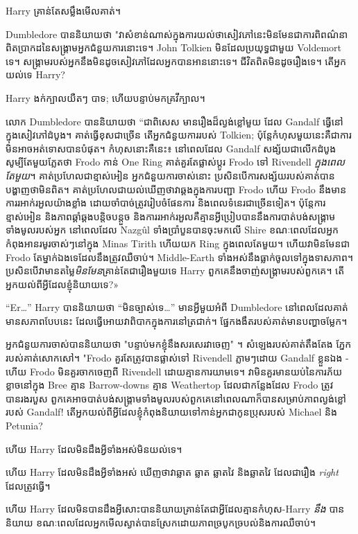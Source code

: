 {Harry គ្រាន់តែសម្លឹងមើលគាត់។

Dumbledore បាននិយាយថា "វាសំខាន់ណាស់ក្នុងការយល់ថាសៀវភៅនេះមិនមែនជាការពិពណ៌នាពិតប្រាកដនៃសង្រ្គាមអ្នកជំនួយការនោះទេ។ John Tolkien មិនដែលប្រយុទ្ធជាមួយ Voldemort ទេ។ សង្រ្គាមរបស់អ្នកនឹងមិនដូចសៀវភៅដែលអ្នកបានអាននោះទេ។ ជីវិតពិតមិនដូចរឿងទេ។ តើអ្នកយល់ទេ Harry?

Harry ងក់ក្បាលយឺតៗ បាទ; ហើយបន្ទាប់មកគ្រវីក្បាល។

លោក Dumbledore បាននិយាយថា “ជាពិសេស មានរឿងដ៏ល្ងង់ខ្លៅមួយ ដែល Gandalf ធ្វើនៅក្នុងសៀវភៅដំបូង។ គាត់ធ្វើខុសជាច្រើន តើអ្នកជំនួយការរបស់ Tolkien; ប៉ុន្តែ​កំហុស​មួយ​នេះ​គឺ​ជា​ការ​មិន​អាច​អត់​ទោស​បាន​បំផុត​។ កំហុសនោះគឺនេះ៖ នៅពេលដែល Gandalf សង្ស័យជាលើកដំបូង សូម្បីតែមួយភ្លែតថា Frodo កាន់ One Ring គាត់គួរតែផ្លាស់ប្តូរ Frodo ទៅ Rivendell \emph{ក្នុងពេលតែមួយ}។ គាត់ប្រហែលជាខ្មាស់អៀន អ្នកជំនួយការចាស់នោះ ប្រសិនបើការសង្ស័យរបស់គាត់បានបង្ហាញថាមិនពិត។ គាត់ប្រហែលជាយល់ឃើញថាវាឆ្គងក្នុងការបញ្ជា Frodo ហើយ Frodo នឹងមានការរអាក់រអួលយ៉ាងខ្លាំង ដោយចាំបាច់ត្រូវរៀបចំផែនការ និងពេលទំនេរជាច្រើនទៀត។ ប៉ុន្តែការខ្មាស់អៀន និងភាពឆ្គាំឆ្គងបន្តិចបន្តួច និងការរអាក់រអួលគឺគ្មានអ្វីប្រៀបបាននឹងការបាត់បង់សង្រ្គាមទាំងមូលរបស់អ្នក នៅពេលដែល Nazgûl ទាំងប្រាំបួនបានចុះមកលើ Shire ខណៈពេលដែលអ្នកកំពុងអានរមូរចាស់ៗនៅក្នុង Minas Tirith ហើយយក Ring ក្នុងពេលតែមួយ។ ហើយវាមិនមែនជា Frodo តែម្នាក់ឯងទេដែលនឹងត្រូវឈឺចាប់។ Middle-Earth ទាំងអស់នឹងធ្លាក់ចូលទៅក្នុងទាសភាព។ ប្រសិនបើវាមានតម្លៃ\emph{មិនមែន}គ្រាន់តែជារឿងមួយទេ Harry ពួកគេនឹងចាញ់សង្រ្គាមរបស់ពួកគេ។ តើអ្នកយល់ពីអ្វីដែលខ្ញុំនិយាយទេ?»

“Er…” Harry បាននិយាយថា “មិនច្បាស់ទេ…” មានអ្វីមួយអំពី Dumbledore នៅពេលដែលគាត់មានសភាពបែបនេះ ដែលធ្វើអោយវាពិបាកក្នុងការនៅត្រជាក់។ ផ្នែកងងឹតរបស់គាត់មានបញ្ហាចម្លែក។

អ្នកជំនួយការចាស់បាននិយាយថា "បន្ទាប់មកខ្ញុំនឹងសរសេរវាចេញ" ។ សំឡេងរបស់គាត់តឹងតែង ភ្នែករបស់គាត់សោកសៅ។ "Frodo គួរតែត្រូវបានផ្លាស់ទៅ Rivendell ភ្លាមៗដោយ Gandalf ខ្លួនឯង - ហើយ Frodo មិនគួរចាកចេញពី Rivendell ដោយគ្មានការយាមទេ។ វាមិនគួរមានយប់នៃការភ័យខ្លាចនៅក្នុង Bree គ្មាន Barrow-downs គ្មាន Weathertop ដែលជាកន្លែងដែល Frodo ត្រូវបានរងរបួស ពួកគេអាចបាត់បង់សង្រ្គាមទាំងមូលរបស់ពួកគេនៅពេលណាក៏បានសម្រាប់ភាពល្ងង់ខ្លៅរបស់ Gandalf! តើ​អ្នក​យល់​ពី​អ្វី​ដែល​ខ្ញុំ​កំពុង​និយាយ​ទៅ​កាន់​អ្នក​ជា​កូន​ប្រុស​របស់ Michael និង Petunia?

ហើយ Harry ដែលមិនដឹងអ្វីទាំងអស់មិនយល់ទេ។

ហើយ Harry ដែលមិនដឹងអ្វីទាំងអស់ ឃើញថាវាឆ្លាត ឆ្លាត ឆ្លាតវៃ និងឆ្លាតវៃ ដែលជារឿង \emph{right} ដែលត្រូវធ្វើ។

ហើយ Harry ដែលមិនបានដឹងអ្វីសោះបាននិយាយគ្រាន់តែជាអ្វីដែលគ្មានកំហុស-Harry \emph{នឹង} បាននិយាយ ខណៈពេលដែលអ្នកមើលស្ងាត់បានស្រែកដោយភាពច្របូកច្របល់និងការឈឺចាប់។

}
